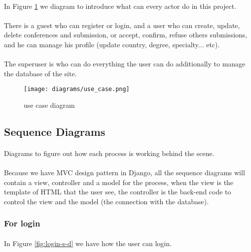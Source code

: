 	\paragraph{}
	In Figure \ref{fig:use-case-d} we diagram to introduce what can every actor do in this project.
	\paragraph{}
	There is a guest who can register or login, and a user who can create, update, delete conferences and submission, or accept, confirm, refuse others submissions, and he can manage his profile (update country, degree, specialty... etc).
	\paragraph{}
	The superuser is who can do everything the user can do additionally to manage the database of the site.
	
		\begin{figure}[!ht]
			\centering
			\texttt{[image: diagrams/use\_case.png]}
			\caption{use case diagram}
			\label{fig:use-case-d}
		\end{figure}
	
	\subsection{Sequence Diagrams}
	\paragraph{}
	Diagrams to figure out how each process is working behind the scene.
	\paragraph{}
	Because we have MVC design pattern in Django, all the sequence diagrams will contain a view, controller and a model for the process, when the view is the template of HTML that the user see, the controller is the back-end code to control the view and the model (the connection with the database).
	
	
	\subsubsection{For login}
	\paragraph{}
	In Figure \ref{fig:login-s-d} we have how the user can login.
